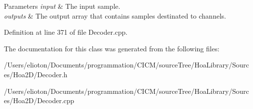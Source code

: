 \begin{DoxyParams}{Parameters}
{\em input} & The input sample. \\
\hline
{\em outputs} & The output array that contains samples destinated to channels. \\
\hline
\end{DoxyParams}


Definition at line 371 of file Decoder.\-cpp.



The documentation for this class was generated from the following files\-:\begin{DoxyCompactItemize}
\item 
/\-Users/elioton/\-Documents/programmation/\-C\-I\-C\-M/source\-Tree/\-Hoa\-Library/\-Sources/\-Hoa2\-D/Decoder.\-h\item 
/\-Users/elioton/\-Documents/programmation/\-C\-I\-C\-M/source\-Tree/\-Hoa\-Library/\-Sources/\-Hoa2\-D/Decoder.\-cpp\end{DoxyCompactItemize}
